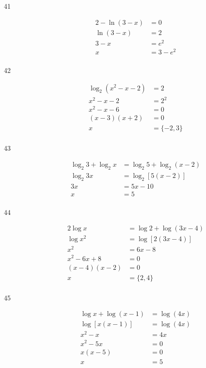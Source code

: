 \documentclass{exam}
\begin{document}
\begin{description}
      \item[41] 
        \begin{align*}
          2 - \ln(3 - x) &= 0 \\
          \ln(3 - x)     &= 2 \\
          3 - x          &= e^2 \\
          x              &= \boxed{3 - e^2} \\
        \end{align*}

      \item[42] 
        \begin{align*}
          \log_2(x^2 - x - 2) &= 2 \\
          x^2 - x - 2         &= 2^2 \\
          x^2 - x - 6         &= 0 \\
          (x - 3)(x + 2)      &= 0 \\
          x                   &= \boxed{\{ - 2, 3\}} \\
        \end{align*}

      \item[43] 
        \begin{align*}
          \log_2 3 + \log_2 x &= \log_2 5 + \log_2(x - 2) \\
          \log_2 3x           &= \log_2 [5 (x - 2)] \\
          3x                  &= 5x - 10 \\
          x                   &= \boxed{5} \\
        \end{align*}

      \item[44] 
        \begin{align*}
          2 \log x       &= \log 2 + \log(3x - 4) \\
          \log x^2       &= \log [2(3x - 4)] \\
          x^2            &= 6x - 8 \\
          x^2 - 6x + 8   &= 0 \\
          (x - 4)(x - 2) &= 0 \\
          x              &= \boxed{\{2, 4\}} \\
        \end{align*}

      \item[45] 
        \begin{align*}
          \log x + \log(x - 1) &= \log (4x) \\
          \log [x(x - 1)]      &= \log (4x) \\
          x^2 - x              &= 4x \\
          x^2 - 5x             &= 0 \\
          x(x - 5)             &= 0 \\
          x                    &= \boxed{5} \\
        \end{align*}


\end{description}
\end{document}
